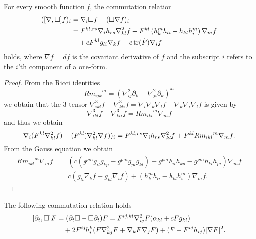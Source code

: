 \documentclass{amsart}
\begin{document}
\begin{lemma}
\label{lem:gradBox}
For every smooth function $f$, the commutation relation
\[
\begin{split}
([\nabla, \Box]f)_i &= \nabla_i \Box f - (\Box \nabla f)_i\\
                &= F^{kl,rs} \nabla_i h_{rs} \nabla^2_{kl} f + F^{kl}\left(h^{m}_{k}h_{li} - h_{kl}h^{m}_{i}\right) \nabla_m f \\
&\quad + c F^{kl} g_{li} \nabla_k f - c \operatorname{tr}(\dot{F}) \nabla_i f
\end{split}
\]
holds, where \(\nabla f = df\) is the covariant derivative of \(f\) and the subscript \(i\) refers to the \(i\)'th component of a one-form.
\end{lemma}
\begin{proof}
From the Ricci identities
\[
{Rm_{ijk}}^m  = \left(\nabla^2_{ij} \partial_k - \nabla^2_{ji} \partial_k\right)^m
\]
we obtain that the $3$-tensor $\nabla^3_{ikl}f-\nabla^3_{kli}f=\nabla_i\nabla_k\nabla_lf-\nabla_k\nabla_i\nabla_lf$
is given by
\[
\nabla^3_{ikl}f-\nabla^3_{kli}f={{Rm}_{ikl}}^m\nabla_m f
\]
and thus we obtain
\[
\nabla_i (F^{kl} \nabla^2_{kl} f) - (F^{kl}(\nabla^2_{kl} \nabla f))_i = F^{kl,rs} \nabla_i h_{rs} \nabla^2_{kl}f+ F^{kl}{{Rm}_{ikl}}^{m} \nabla_m f.
\]
From the Gauss equation we obtain
\[
\begin{split}
{{Rm}_{ikl}}^{m} \nabla_m f &= \left(c\left(g^{pm}g_{il}g_{kp}  - g^{pm}g_{pi}g_{kl}\right) + g^{pm} h_{il}h_{kp} - g^{pm}h_{kl}h_{pi}\right) \nabla_m f \\
&= c\left(g_{li} \nabla_k f - g_{kl} \nabla_i f\right) + \left(h^{m}_{k}h_{li} - h_{kl}h^{m}_{i}\right) \nabla_m f.
\end{split}
\]
\end{proof}
\begin{lemma}
\label{lem:deltBox}
The following commutation relation holds
\[
\begin{split}
[\partial_t, \Box] F &= (\partial_{t}\Box - \Box\partial_{t}) F = F^{ij,kl} \nabla^2_{ij} F (\alpha_{kl} + c F g_{kl}) \\
&\quad + 2F^{ij}h^{k}_{i} (F \nabla^2_{k
j} F + \nabla_k F \nabla_j F) + (F - F^{ij}h_{ij})| \nabla F|^{2}.
\end{split}
\]
\end{lemma}
\end{document}
